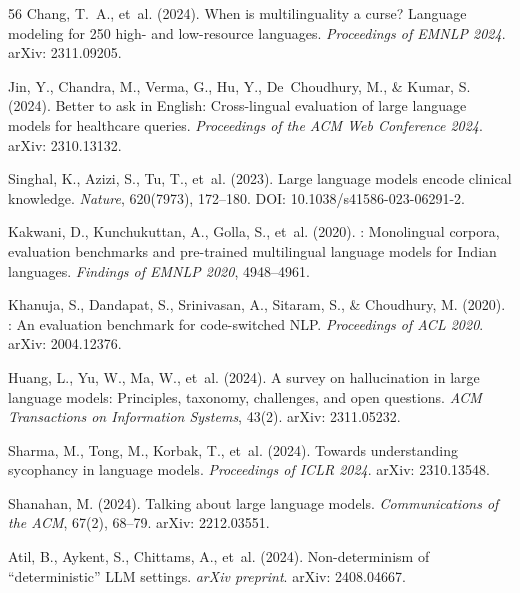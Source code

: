 \documentclass[11pt,a4paper]{article}
\begin{document}
\begin{thebibliography}{56}
Chang, T.~A., et~al. (2024).
\newblock When is multilinguality a curse? Language modeling for 250 high- and low-resource languages.
\newblock \emph{Proceedings of EMNLP 2024}.
\newblock arXiv: 2311.09205.

Jin, Y., Chandra, M., Verma, G., Hu, Y., De~Choudhury, M., \& Kumar, S. (2024).
\newblock Better to ask in {English}: Cross-lingual evaluation of large language models for healthcare queries.
\newblock \emph{Proceedings of the ACM Web Conference 2024}.
\newblock arXiv: 2310.13132.

Singhal, K., Azizi, S., Tu, T., et~al. (2023).
\newblock Large language models encode clinical knowledge.
\newblock \emph{Nature}, 620(7973), 172--180.
\newblock DOI: 10.1038/s41586-023-06291-2.

Kakwani, D., Kunchukuttan, A., Golla, S., et~al. (2020).
: Monolingual corpora, evaluation benchmarks and pre-trained multilingual language models for {Indian} languages.
\newblock \emph{Findings of EMNLP 2020}, 4948--4961.

Khanuja, S., Dandapat, S., Srinivasan, A., Sitaram, S., \& Choudhury, M. (2020).
: An evaluation benchmark for code-switched {NLP}.
\newblock \emph{Proceedings of ACL 2020}.
\newblock arXiv: 2004.12376.

Huang, L., Yu, W., Ma, W., et~al. (2024).
\newblock A survey on hallucination in large language models: Principles, taxonomy, challenges, and open questions.
\newblock \emph{ACM Transactions on Information Systems}, 43(2).
\newblock arXiv: 2311.05232.

Sharma, M., Tong, M., Korbak, T., et~al. (2024).
\newblock Towards understanding sycophancy in language models.
\newblock \emph{Proceedings of ICLR 2024}.
\newblock arXiv: 2310.13548.

Shanahan, M. (2024).
\newblock Talking about large language models.
\newblock \emph{Communications of the ACM}, 67(2), 68--79.
\newblock arXiv: 2212.03551.

Atil, B., Aykent, S., Chittams, A., et~al. (2024).
\newblock Non-determinism of ``deterministic'' {LLM} settings.
\newblock \emph{arXiv preprint}.
\newblock arXiv: 2408.04667.


\end{thebibliography}
\end{document}
